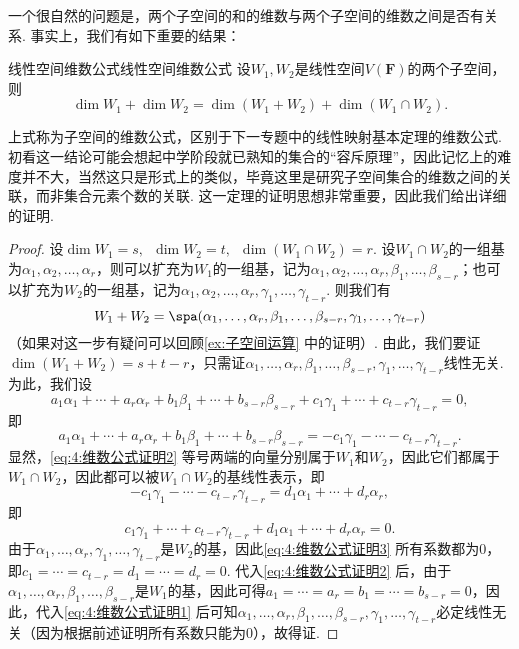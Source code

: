 一个很自然的问题是，两个子空间的和的维数与两个子空间的维数之间是否有关系. 事实上，我们有如下重要的结果：

\begin{theorem}{线性空间维数公式}{线性空间维数公式}
    设$W_1,W_2$是线性空间$V(\mathbf{F})$的两个子空间，则
    \[\dim W_1+\dim W_2=\dim(W_1+W_2)+\dim(W_1\cap W_2).\]
\end{theorem}
上式称为子空间的维数公式，区别于下一专题中的线性映射基本定理的维数公式. 初看这一结论可能会想起中学阶段就已熟知的集合的``容斥原理''，因此记忆上的难度并不大，当然这只是形式上的类似，毕竟这里是研究子空间集合的维数之间的关联，而非集合元素个数的关联. 这一定理的证明思想非常重要，因此我们给出详细的证明.

\begin{proof}
    设$\dim W_1=s,\enspace \dim W_2=t,\enspace \dim(W_1\cap W_2)=r$. 设$W_1\cap W_2$的一组基为$\alpha_1,\alpha_2,\ldots,\alpha_r$，则可以扩充为$W_1$的一组基，记为$\alpha_1,\alpha_2,\ldots,\alpha_r,\beta_1,\ldots,\beta_{s-r}$；也可以扩充为$W_2$的一组基，记为$\alpha_1,\alpha_2,\ldots,\alpha_r,\gamma_1,\ldots,\gamma_{t-r}$. 则我们有
    \[W_1+W_2=\spa(\alpha_1,\ldots,\alpha_r,\beta_1,\ldots,\beta_{s-r},\gamma_1,\ldots,\gamma_{t-r})\]
    （如果对这一步有疑问可以回顾\autoref{ex:子空间运算} 中的证明）. 由此，我们要证$\dim (W_1+W_2)=s+t-r$，只需证$\alpha_1,\ldots,\alpha_r,\beta_1,\ldots,\beta_{s-r},\gamma_1,\ldots,\gamma_{t-r}$线性无关. 为此，我们设
    \begin{equation}\label{eq:4:维数公式证明1}
        a_1\alpha_1+\cdots+a_r\alpha_r+b_1\beta_1+\cdots+b_{s-r}\beta_{s-r}+c_1\gamma_1+\cdots+c_{t-r}\gamma_{t-r}=0,
    \end{equation}
    即
    \begin{equation}\label{eq:4:维数公式证明2}
        a_1\alpha_1+\cdots+a_r\alpha_r+b_1\beta_1+\cdots+b_{s-r}\beta_{s-r}=-c_1\gamma_1-\cdots-c_{t-r}\gamma_{t-r}.
    \end{equation}
    显然，\autoref{eq:4:维数公式证明2} 等号两端的向量分别属于$W_1$和$W_2$，因此它们都属于$W_1\cap W_2$，因此都可以被$W_1\cap W_2$的基线性表示，即
    \[-c_1\gamma_1-\cdots-c_{t-r}\gamma_{t-r}=d_1\alpha_1+\cdots+d_r\alpha_r,\]
    即
    \begin{equation}\label{eq:4:维数公式证明3}
        c_1\gamma_1+\cdots+c_{t-r}\gamma_{t-r}+d_1\alpha_1+\cdots+d_r\alpha_r=0.
    \end{equation}
    由于$\alpha_1,\ldots,\alpha_r,\gamma_1,\ldots,\gamma_{t-r}$是$W_2$的基，因此\autoref{eq:4:维数公式证明3} 所有系数都为0，即$c_1=\cdots=c_{t-r}=d_1=\cdots=d_r=0$. 代入\autoref{eq:4:维数公式证明2} 后，由于$\alpha_1,\ldots,\alpha_r,\beta_1,\ldots,\beta_{s-r}$是$W_1$的基，因此可得$a_1=\cdots=a_r=b_1=\cdots=b_{s-r}=0$，因此，代入\autoref{eq:4:维数公式证明1} 后可知$\alpha_1,\ldots,\alpha_r,\beta_1,\ldots,\beta_{s-r},\gamma_1,\ldots,\gamma_{t-r}$必定线性无关（因为根据前述证明所有系数只能为0），故得证.
\end{proof}

